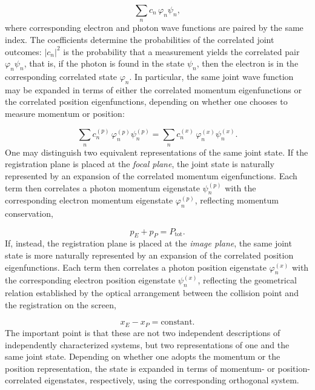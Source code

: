 \documentclass[pdflatex]{sn-jnl}
\begin{document}
\begin{equation*}
\sum_n c_n\,\varphi_n\psi_n ,
\end{equation*}
%
where corresponding electron and photon wave functions are paired by the same index. The coefficients determine the probabilities of the correlated joint outcomes: $|c_n|^2$ is the probability that a measurement yields the correlated pair $\varphi_n\psi_n$, that is, if the photon is found in the state $\psi_n$, then the electron is in the corresponding correlated state $\varphi_n$. In particular, the same joint wave function may be expanded in terms of either the correlated momentum eigenfunctions or the correlated position eigenfunctions, depending on whether one chooses to measure momentum or position:

\begin{equation*}
\sum_n c_n^{(p)}\,
\varphi_n^{(p)}
\psi_n^{(p)}
=
\sum_n c_n^{(x)}\,
\varphi_n^{(x)}
\psi_n^{(x)}.
\end{equation*}
%
One may distinguish two equivalent representations of the same joint state. If the registration plane is placed at the \emph{focal plane}, the joint state is naturally represented by an expansion of the correlated momentum eigenfunctions. Each term then correlates a photon momentum eigenstate $\psi_n^{(p)}$ with the corresponding electron momentum eigenstate $\varphi_n^{(p)}$, reflecting momentum conservation,

\begin{equation*}
p_E+p_P=P_{\mathrm{tot}}.
\end{equation*}
%
If, instead, the registration plane is placed at the \emph{image plane}, the same joint state is more naturally represented by an expansion of the correlated position eigenfunctions. Each term then correlates a photon position eigenstate $\varphi_n^{(x)}$ with the corresponding electron position eigenstate $\psi_n^{(x)}$, reflecting the geometrical relation established by the optical arrangement between the collision point and the registration on the screen,

\begin{equation*}
x_E-x_P=\text{constant}.
\end{equation*}
%
The important point is that these are not two independent descriptions of independently characterized systems, but two representations of one and the same joint state. Depending on whether one adopts the momentum or the position representation, the state is expanded in terms of momentum- or position-correlated eigenstates, respectively, using the corresponding orthogonal system.
\end{document}
